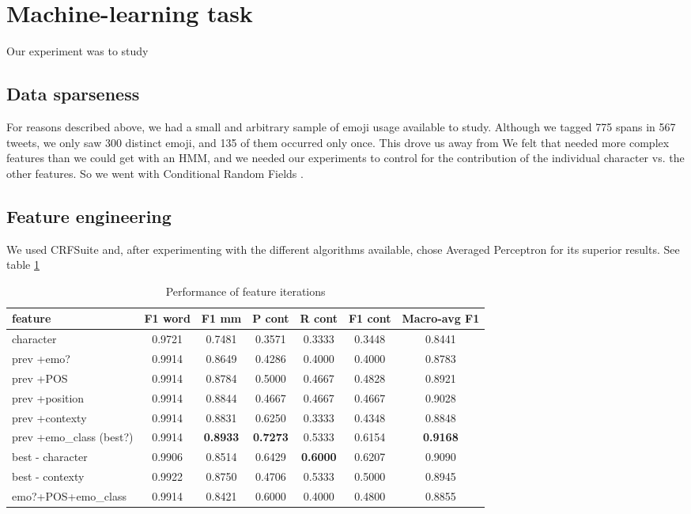 \documentclass[11pt]{article}
\begin{document}
\section{Machine-learning task}

Our experiment was to study 

\subsection{Data sparseness}

For reasons described above, we had a small and arbitrary sample of emoji usage available to study. Although we tagged 775 spans in 567 tweets, we only saw 300 distinct emoji, and 135 of them occurred only once. This drove us away from
We felt that needed more complex features than we could get with an HMM, and we needed our experiments to 
control for the contribution of the individual character vs. the other features. So we went with Conditional Random Fields \cite{CRFcite}.


\subsection{Feature engineering}

We used CRFSuite \cite{CRFSuite} and, after experimenting with the different algorithms available,
chose Averaged Perceptron \cite{AvePerceptron} for its superior results. See table \ref{tab:PRF1}

\begin{table}[htp]
\caption{Performance of feature iterations}
\begin{center}
\begin{tabular}{|l| c c c c c c|}
\hline
feature                 & F1 word   & F1 mm  & P cont & R cont   & F1 cont & Macro-avg F1 \\\hline
character               & 0.9721    & 0.7481 & 0.3571 & 0.3333   & 0.3448  & 0.8441\\
 prev +emo?         & 0.9914    & 0.8649 & 0.4286 & 0.4000   & 0.4000  & 0.8783\\
 prev +POS              & 0.9914    & 0.8784 & 0.5000 & 0.4667   & 0.4828  & 0.8921\\
 prev +position         & 0.9914    & 0.8844 & 0.4667 & 0.4667   & 0.4667  & 0.9028\\
 prev +contexty         & 0.9914    & 0.8831 & 0.6250 & 0.3333   & 0.4348  & 0.8848\\
prev +emo\_class (best?)& 0.9914    & \textbf{0.8933} & \textbf{0.7273} & 0.5333   & 0.6154  & \textbf{0.9168}\\
best - character        & 0.9906    & 0.8514 & 0.6429 & \textbf{0.6000}   & 0.6207  & 0.9090\\
best - contexty         & 0.9922    & 0.8750 & 0.4706 & 0.5333   & 0.5000  & 0.8945\\
emo?+POS+emo\_class & 0.9914 & 0.8421 & 0.6000 & 0.4000 & 0.4800 & 0.8855\\
\hline
\end{tabular}
\end{center}
\label{tab:PRF1}
\end{table}%
\end{document}
